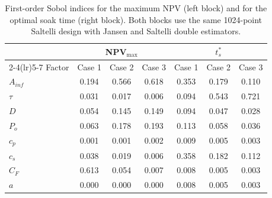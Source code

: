 \begin{table}[htbp]
\centering
\caption{First-order Sobol indices for the maximum NPV (left block) and for the optimal soak time (right block). Both blocks use the same 1024-point Saltelli design with Jansen and Saltelli double estimators.}
\label{tab:sobol}
\small
\begin{tabular}{@{}lcccccc@{}}
\toprule
& \multicolumn{3}{c}{NPV$_{\max}$} & \multicolumn{3}{c}{$t_s^\ast$} \\
\cmidrule(lr){2-4}\cmidrule(lr){5-7}
Factor & Case 1 & Case 2 & Case 3 & Case 1 & Case 2 & Case 3 \\
\midrule
$A_{inf}$ & 0.194 & 0.566 & 0.618 & 0.353 & 0.179 & 0.110 \\
$\tau$ & 0.031 & 0.017 & 0.006 & 0.094 & 0.543 & 0.721 \\
$D$ & 0.054 & 0.145 & 0.149 & 0.094 & 0.047 & 0.028 \\
$P_{o}$ & 0.063 & 0.178 & 0.193 & 0.113 & 0.058 & 0.036 \\
$c_{p}$ & 0.001 & 0.001 & 0.002 & 0.009 & 0.005 & 0.003 \\
$c_{s}$ & 0.038 & 0.019 & 0.006 & 0.358 & 0.182 & 0.112 \\
$C_{F}$ & 0.613 & 0.054 & 0.007 & 0.008 & 0.005 & 0.003 \\
$a$ & 0.000 & 0.000 & 0.000 & 0.008 & 0.005 & 0.003 \\
\bottomrule
\end{tabular}
\end{table}
